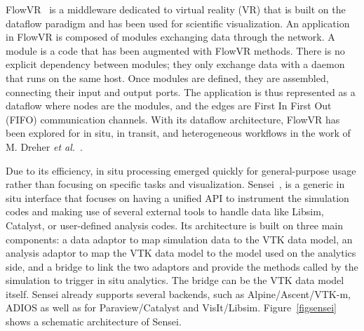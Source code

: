 FlowVR~\cite{allard_flowvr_2004, allard_distributed_2006_flowvr, arcila_flowvr_2006} is a middleware dedicated to virtual reality (VR) that is built on the dataflow\cite{sousa2012dataflow} paradigm and has been used for scientific visualization. 
An application in FlowVR is composed of modules exchanging data through the network. A module is a code that has been augmented with FlowVR methods. There is no explicit dependency between modules; they only exchange data with a daemon that runs on the same host. Once modules are defined, they are assembled, connecting their input and output ports. The application is thus represented as a dataflow where nodes are the modules, and the edges are First In First Out (FIFO) communication channels.
With its dataflow architecture, FlowVR has been explored for in situ, in transit, and heterogeneous workflows in the work of M. Dreher \textit{et al.}~\cite{dreher_methodes_2015, dreher_flexible_2014, dreher_exavis}. 


Due to its efficiency, in situ processing emerged quickly for general-purpose usage rather than focusing on specific tasks and visualization. Sensei~\cite{ayachit_sensei_2016, bethel_sensei_2022, noauthor_sensei_web, git_sensei_2022}, is a generic in situ interface that focuses on having a unified API to instrument the simulation codes and making use of several external tools to handle data like Libsim, Catalyst, or user-defined analysis codes. 
Its architecture is built on three main components: a data adaptor to map simulation data to the VTK data model, an analysis adaptor to map the VTK data model to the model used on the analytics side, and a bridge to link the two adaptors and provide the methods called by the simulation to trigger in situ analytics. The bridge can be the VTK data model itself. Sensei already supports several backends, such as Alpine/Ascent/VTK-m\cite{Larsen-alpine-isav17, moreland_vtk-m_2016}, ADIOS\cite{lofstead_insights_2013_adios, boyuka_transparent_2014_adios} as well as for Paraview/Catalyst and VisIt/Libsim. Figure~\ref{figsensei} shows a schematic architecture of Sensei. 

